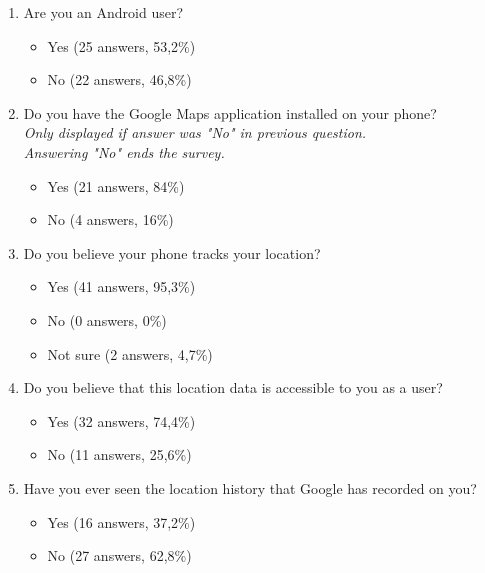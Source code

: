 \documentclass[12p]{article}
\begin{document}
		\begin{enumerate}
		    \item Are you an Android user?
		    \begin{itemize}
		        \item Yes (25 answers, 53,2\%)
		        \item No (22 answers, 46,8\%)
		    \end{itemize}
		    
		    \item Do you have the Google Maps application installed on your phone?
		    \\\textit{Only displayed if answer was "No" in previous question.}
		    \\\textit{Answering "No" ends the survey.}
		    \begin{itemize}
		        \item Yes (21 answers, 84\%)
		        \item No (4 answers, 16\%)
		    \end{itemize}
		    
		    \item Do you believe your phone tracks your location?
		    \begin{itemize}
		        \item Yes (41 answers, 95,3\%)
		        \item No (0 answers, 0\%)
		        \item Not sure (2 answers, 4,7\%)
		    \end{itemize}
		    
		    \item Do you believe that this location data is accessible to you as a user?
		    \begin{itemize}
		        \item Yes (32 answers, 74,4\%)
		        \item No (11 answers, 25,6\%)
		    \end{itemize}
		    
		    \item Have you ever seen the location history that Google has recorded on you?
		    \begin{itemize}
		        \item Yes (16 answers, 37,2\%)
		        \item No (27 answers, 62,8\%)
		    \end{itemize}
		    

\end{enumerate}
\end{document}
